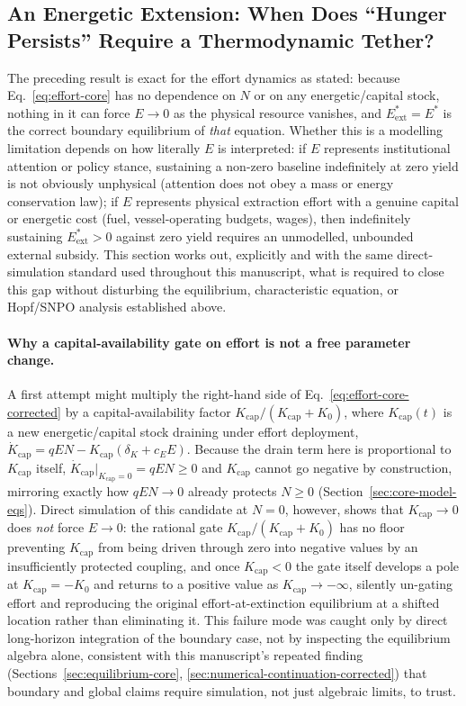 \documentclass[twocolumn,10pt]{article}
\begin{document}
\subsection{An Energetic Extension: When Does ``Hunger Persists'' Require a Thermodynamic Tether?}
\label{sec:thermodynamic-tether}
The preceding result is exact for the effort dynamics as stated: because Eq.~\eqref{eq:effort-core} has no dependence on $N$ or on any energetic/capital stock, nothing in it can force $E\to0$ as the physical resource vanishes, and $E^*_{\text{ext}}=E^*$ is the correct boundary equilibrium of \emph{that} equation. Whether this is a modelling limitation depends on how literally $E$ is interpreted: if $E$ represents institutional attention or policy stance, sustaining a non-zero baseline indefinitely at zero yield is not obviously unphysical (attention does not obey a mass or energy conservation law); if $E$ represents physical extraction effort with a genuine capital or energetic cost (fuel, vessel-operating budgets, wages), then indefinitely sustaining $E^*_{\text{ext}}>0$ against zero yield requires an unmodelled, unbounded external subsidy. This section works out, explicitly and with the same direct-simulation standard used throughout this manuscript, what is required to close this gap without disturbing the equilibrium, characteristic equation, or Hopf/SNPO analysis established above.

\paragraph{Why a capital-availability gate on effort is not a free parameter change.} A first attempt might multiply the right-hand side of Eq.~\eqref{eq:effort-core-corrected} by a capital-availability factor $K_{\text{cap}}/(K_{\text{cap}}+K_0)$, where $K_{\text{cap}}(t)$ is a new energetic/capital stock draining under effort deployment, $\dot K_{\text{cap}}=qEN-K_{\text{cap}}(\delta_K+c_EE)$. Because the drain term here is proportional to $K_{\text{cap}}$ itself, $\dot K_{\text{cap}}|_{K_{\text{cap}}=0}=qEN\ge0$ and $K_{\text{cap}}$ cannot go negative by construction, mirroring exactly how $qEN\to0$ already protects $N\ge0$ (Section~\ref{sec:core-model-eqs}). Direct simulation of this candidate at $N=0$, however, shows that $K_{\text{cap}}\to0$ does \emph{not} force $E\to0$: the rational gate $K_{\text{cap}}/(K_{\text{cap}}+K_0)$ has no floor preventing $K_{\text{cap}}$ from being driven through zero into negative values by an insufficiently protected coupling, and once $K_{\text{cap}}<0$ the gate itself develops a pole at $K_{\text{cap}}=-K_0$ and returns to a positive value as $K_{\text{cap}}\to-\infty$, silently un-gating effort and reproducing the original effort-at-extinction equilibrium at a shifted location rather than eliminating it. This failure mode was caught only by direct long-horizon integration of the boundary case, not by inspecting the equilibrium algebra alone, consistent with this manuscript's repeated finding (Sections~\ref{sec:equilibrium-core}, \ref{sec:numerical-continuation-corrected}) that boundary and global claims require simulation, not just algebraic limits, to trust.
\end{document}
